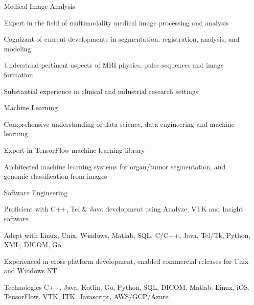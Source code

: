 
\begin{cvskills}


  \cvskill
    {Medical Image Analysis} %
    {
      \begin{cvitems}
      \item Expert in the field of multimodality medical image processing and analysis
      \item Cognizant of current developments in segmentation, registration, analysis, and modeling
      \item Understand pertinent aspects of MRI physics, pulse sequences and image formation
      \item Substantial experience in clinical and industrial research settings
      \end{cvitems}        
}
  \cvskill
    {Machine Learning} %
    {
      \begin{cvitems}
      \item Comprehensive understanding of data science, data engineering and machine learning
      \item Expert in TensorFlow machine learning library
        \item Architected machine learning systems for organ/tumor segmentation, and genomic classification from images
      \end{cvitems}
    }

    \cvskill
        {Software Engineering}
        {
          \begin{cvitems}
          \item Proficient with C++, Tcl \& Java development using Analyze, VTK and Insight software
          \item Adept with Linux, Unix, Windows, Matlab, SQL, C/C++, Java, Tcl/Tk, Python, XML, DICOM, Go
          \item Experienced in cross platform development, enabled commercial releases for Unix and Windows NT
          \end{cvitems}
        }

    \cvskill
        {Technologies}
        {C++, Java, Kotlin, Go, Python, SQL, DICOM, Matlab, Linux, iOS, TensorFlow, VTK, ITK, Javascript, AWS/GCP/Azure}

    
\end{cvskills}
